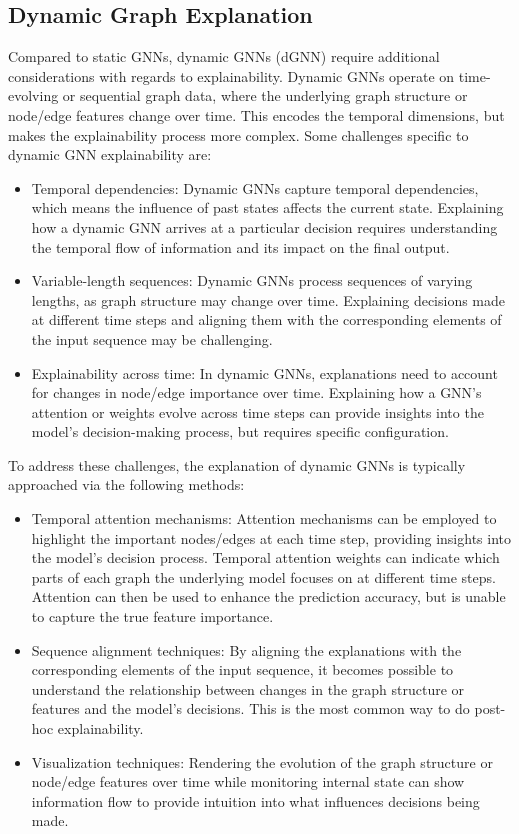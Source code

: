 {\subsection{Dynamic Graph Explanation}
Compared to static GNNs, dynamic GNNs (dGNN) require additional considerations with regards to explainability. Dynamic GNNs operate on time-evolving or sequential graph data, where the underlying graph structure or node/edge features change over time. This encodes the temporal dimensions, but makes the explainability process more complex. Some challenges specific to dynamic GNN explainability are:
\begin{itemize}
    \item Temporal dependencies: Dynamic GNNs capture temporal dependencies, which means the influence of past states affects the current state. Explaining how a dynamic GNN arrives at a particular decision requires understanding the temporal flow of information and its impact on the final output.
    \item Variable-length sequences: Dynamic GNNs process sequences of varying lengths, as graph structure may change over time. Explaining decisions made at different time steps and aligning them with the corresponding elements of the input sequence may be challenging.
    \item Explainability across time: In dynamic GNNs, explanations need to account for changes in node/edge importance over time. Explaining how a GNN's attention or weights evolve across time steps can provide insights into the model's decision-making process, but requires specific configuration.
\end{itemize}

To address these challenges, the explanation of dynamic GNNs is typically approached via the following methods:

\begin{itemize}
    \item Temporal attention mechanisms: Attention mechanisms can be employed to highlight the important nodes/edges at each time step, providing insights into the model's decision process. Temporal attention weights can indicate which parts of each graph the underlying model focuses on at different time steps. Attention can then be used to enhance the prediction accuracy, but is unable to capture the true feature importance\cite{serrano_is_2019}.
    \item Sequence alignment techniques: By aligning the explanations with the corresponding elements of the input sequence, it becomes possible to understand the relationship between changes in the graph structure or features and the model's decisions. This is the most common way to do post-hoc explainability.
    \item Visualization techniques: Rendering the evolution of the graph structure or node/edge features over time while monitoring internal state can show information flow to provide intuition into what influences decisions being made.
\end{itemize}

}
